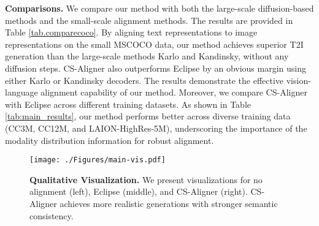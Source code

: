 
\textbf{Comparisons.}
We compare our method with both the large-scale diffusion-based methods and the small-scale alignment methods.
The results are provided in Table \ref{tab.comparecoco}.
By aligning text representations to image representations on the small MSCOCO data, our method achieves superior T2I generation than the large-scale methods Karlo and Kandinsky, without any diffusion steps.
CS-Aligner also outperforms Eclipse by an obvious margin using either Karlo or Kandinsky decoders.
The results demonstrate the effective vision-language alignment capability of our method.
Moreover, we compare CS-Aligner with Eclipse across different training datasets.
As shown in Table \ref{tab:main_results}, our method performs better across diverse training data (CC3M, CC12M, and LAION-HighRes-5M), underscoring the importance of the modality distribution information for robust alignment.




\begin{figure}[t]
  \centering  
  \vspace{-1mm}
  \texttt{[image: ./Figures/main-vis.pdf]} %
  \vspace{-7mm}
\caption{\textbf{Qualitative Visualization.} We present visualizations for no alignment (left), Eclipse (middle), and CS-Aligner (right). CS-Aligner achieves more realistic generations with stronger semantic consistency.} 
\vspace{-3mm}
\label{fig:main_vis}
\end{figure}

